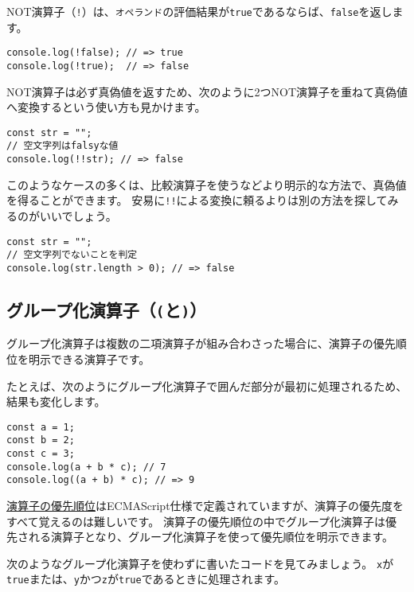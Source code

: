 NOT演算子（\texttt{!}）は、\texttt{オペランド}の評価結果が\texttt{true}であるならば、\texttt{false}を返します。

\begin{lstlisting}
console.log(!false); // => true
console.log(!true);  // => false
\end{lstlisting}

NOT演算子は必ず真偽値を返すため、次のように2つNOT演算子を重ねて真偽値へ変換するという使い方も見かけます。

\begin{lstlisting}
const str = "";
// 空文字列はfalsyな値
console.log(!!str); // => false
\end{lstlisting}

このようなケースの多くは、比較演算子を使うなどより明示的な方法で、真偽値を得ることができます。
安易に\texttt{!!}による変換に頼るよりは別の方法を探してみるのがいいでしょう。

\begin{lstlisting}
const str = "";
// 空文字列でないことを判定
console.log(str.length > 0); // => false
\end{lstlisting}

\hypertarget{group-operator}{%
\subsection{\texorpdfstring{グループ化演算子（\texttt{(}と\texttt{)}）}{グループ化演算子（(と)）}}\label{group-operator}}

グループ化演算子は複数の二項演算子が組み合わさった場合に、演算子の優先順位を明示できる演算子です。

たとえば、次のようにグループ化演算子で囲んだ部分が最初に処理されるため、結果も変化します。

\begin{lstlisting}
const a = 1;
const b = 2;
const c = 3;
console.log(a + b * c); // 7
console.log((a + b) * c); // => 9
\end{lstlisting}

\href{https://developer.mozilla.org/ja/docs/Web/JavaScript/Reference/Operators/Operator_Precedence\#Table}{演算子の優先順位}はECMAScript仕様で定義されていますが、演算子の優先度をすべて覚えるのは難しいです。
演算子の優先順位の中でグループ化演算子は優先される演算子となり、グループ化演算子を使って優先順位を明示できます。

次のようなグループ化演算子を使わずに書いたコードを見てみましょう。
\texttt{x}が\texttt{true}または、\texttt{y}かつ\texttt{z}が\texttt{true}であるときに処理されます。

